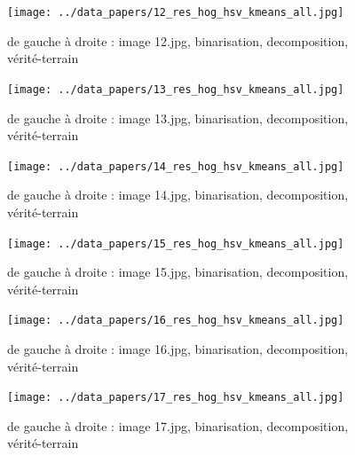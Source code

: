 \documentclass{book}
\begin{document}
\begin{figure}[H]
\begin{center}
\texttt{[image: ../data\_papers/12\_res\_hog\_hsv\_kmeans\_all.jpg]}
\end{center}
\caption{de gauche à droite : image 12.jpg, binarisation, decomposition, vérité-terrain}
\label{12}
\end{figure}
\clearpage


\begin{figure}[H]
\begin{center}
\texttt{[image: ../data\_papers/13\_res\_hog\_hsv\_kmeans\_all.jpg]}
\end{center}
\caption{de gauche à droite : image 13.jpg, binarisation, decomposition, vérité-terrain}
\label{13}
\end{figure}
\clearpage


\begin{figure}[H]
\begin{center}
\texttt{[image: ../data\_papers/14\_res\_hog\_hsv\_kmeans\_all.jpg]}
\end{center}
\caption{de gauche à droite : image 14.jpg, binarisation, decomposition, vérité-terrain}
\label{14}
\end{figure}
\clearpage


\begin{figure}[H]
\begin{center}
\texttt{[image: ../data\_papers/15\_res\_hog\_hsv\_kmeans\_all.jpg]}
\end{center}
\caption{de gauche à droite : image 15.jpg, binarisation, decomposition, vérité-terrain}
\label{15}
\end{figure}
\clearpage


\begin{figure}[H]
\begin{center}
\texttt{[image: ../data\_papers/16\_res\_hog\_hsv\_kmeans\_all.jpg]}
\end{center}
\caption{de gauche à droite : image 16.jpg, binarisation, decomposition, vérité-terrain}
\label{16}
\end{figure}
\clearpage


\begin{figure}[H]
\begin{center}
\texttt{[image: ../data\_papers/17\_res\_hog\_hsv\_kmeans\_all.jpg]}
\end{center}
\caption{de gauche à droite : image 17.jpg, binarisation, decomposition, vérité-terrain}
\label{17}
\end{figure}
\clearpage
\end{document}
